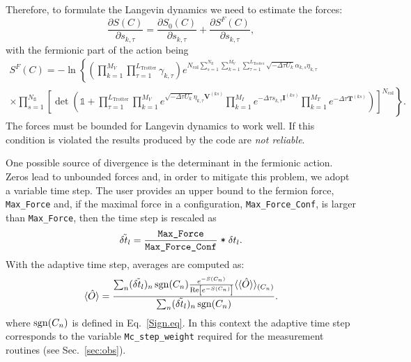 Therefore, to  formulate  the Langevin dynamics  we need  to estimate the forces:
\begin{equation}
	\frac { \partial S (C)}{\partial s_{k,\tau} } =\frac { \partial S_{0}(C)}{\partial s_{k,\tau} } +  \frac { \partial S^F(C)}{\partial s_{k,\tau} },
\end{equation}
with the fermionic part of the action being
\begin{multline}
S^F(C) =   - \ln \left\{  \left( \prod_{k=1}^{M_V} \prod_{\tau=1}^{L_{\mathrm{Trotter}}} \gamma_{k,\tau} \right)
    e^{ N_{\mathrm{col}}\sum\limits_{s=1}^{N_{\mathrm{fl}}} \sum\limits_{k=1}^{M_V} \sum\limits_{\tau = 1}^{L_{\mathrm{Trotter}}}\sqrt{-\Delta \tau U_k}  \alpha_{k,s} \eta_{k,\tau} } 
  \right.  \\
    \left. \times
	\prod_{s=1}^{N_{\mathrm{fl}}}\left[\det\left(  \mathds{1} + 
	\prod_{\tau=1}^{L_{\mathrm{Trotter}}}   
	\prod_{k=1}^{M_V}   e^{  \sqrt{ -\Delta \tau  U_k} \eta_{k,\tau} {\bm V}^{(ks)} }   \prod_{k=1}^{M_I}   e^{  -\Delta \tau s_{k,\tau}  {\bm I}^{(ks)}}  
	\prod_{k=1}^{M_T}   e^{-\Delta \tau {\bm T}^{(ks)}} 
	\right) \right]^{N_{\mathrm{col}}} \right\}  .
\end{multline}
The forces must be bounded for Langevin dynamics to work well. If this condition is violated the results produced by the code are \emph{not reliable}. 

One possible source of divergence is the determinant in the fermionic action. Zeros lead to unbounded forces and, in order to mitigate this problem, we adopt a variable time step.  The user provides an upper bound to the fermion force, \texttt{Max\_Force} and, if the maximal force in a configuration, \texttt{Max\_Force\_Conf}, is larger than \texttt{Max\_Force}, then the time step is rescaled as 
\begin{equation}
     \tilde{\delta t_{l}}   =  \frac{ \texttt{Max\_Force}} {\texttt{Max\_Force\_Conf}} \; \texttt{*} \; \delta t_{l}.
\end{equation}
With the adaptive time  step,  averages are computed as: 
\begin{equation} \label{eq:obs_varstep}
   \langle \hat{O} \rangle = \frac{ \sum_n (  \tilde{\delta t_{l}}  )_n  \operatorname{sgn}(C_n)   \frac{e^{-S(C_n)}}{\operatorname{Re} \left[e^{-S(C_n)} \right]}   \langle \langle \hat{O} \rangle   \rangle_{(C_n)} } {\sum_n (  \tilde{\delta t_{l}}  )_n  \operatorname{sgn}(C_n)  }. 
\end{equation}
where  $\operatorname{sgn}(C_n)$   is defined in Eq.~\eqref{Sign.eq}.    In this context the adaptive time step corresponds to the variable \texttt{Mc\_step\_weight}  required for the measurement routines (see Sec.~\ref{sec:obs}). 

